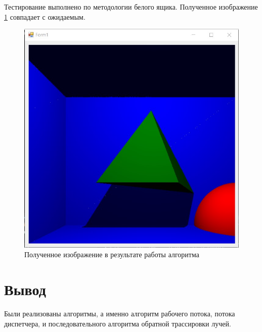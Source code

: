 Тестирование выполнено по методологии белого ящика. Полученное изображение \ref{fig:test} совпадает с ожидаемым.
\begin{figure}[H]
	\centering
	\includegraphics[width=1\linewidth]{inc/img/demographics}
	\caption{Полученное изображение в результате работы алгоритма}
	\label{fig:test}
\end{figure}
\section*{Вывод}

Были реализованы алгоритмы, а именно алгоритм рабочего потока, потока диспетчера, и последовательного алгоритма обратной трассировки лучей.
